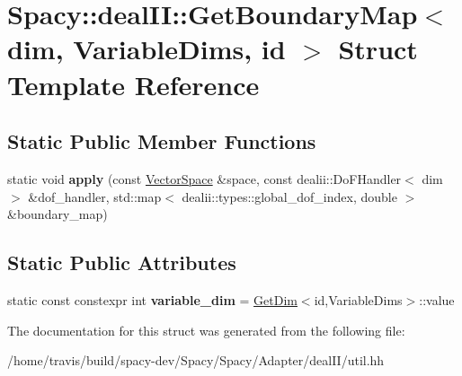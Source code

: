 \hypertarget{structSpacy_1_1dealII_1_1GetBoundaryMap}{\section{Spacy\-:\-:deal\-I\-I\-:\-:Get\-Boundary\-Map$<$ dim, Variable\-Dims, id $>$ Struct Template Reference}
\label{structSpacy_1_1dealII_1_1GetBoundaryMap}
}
\subsection*{Static Public Member Functions}
\begin{DoxyCompactItemize}
\item 
\hypertarget{structSpacy_1_1dealII_1_1GetBoundaryMap_a350717743d86b49614a002522b83988a}{static void {\bfseries apply} (const \hyperlink{classSpacy_1_1VectorSpace}{Vector\-Space} \&space, const dealii\-::\-Do\-F\-Handler$<$ dim $>$ \&dof\-\_\-handler, std\-::map$<$ dealii\-::types\-::global\-\_\-dof\-\_\-index, double $>$ \&boundary\-\_\-map)}\label{structSpacy_1_1dealII_1_1GetBoundaryMap_a350717743d86b49614a002522b83988a}

\end{DoxyCompactItemize}
\subsection*{Static Public Attributes}
\begin{DoxyCompactItemize}
\item 
\hypertarget{structSpacy_1_1dealII_1_1GetBoundaryMap_afab4389c174cb85c5b1440585fe56e6d}{static const constexpr int {\bfseries variable\-\_\-dim} = \hyperlink{structSpacy_1_1dealII_1_1GetDim}{Get\-Dim}$<$id,Variable\-Dims$>$\-::value}\label{structSpacy_1_1dealII_1_1GetBoundaryMap_afab4389c174cb85c5b1440585fe56e6d}

\end{DoxyCompactItemize}


The documentation for this struct was generated from the following file\-:\begin{DoxyCompactItemize}
\item 
/home/travis/build/spacy-\/dev/\-Spacy/\-Spacy/\-Adapter/deal\-I\-I/util.\-hh\end{DoxyCompactItemize}
